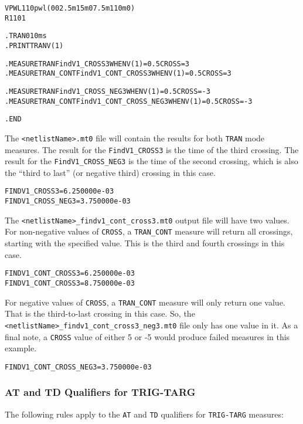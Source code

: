 \begin{alltt}
VPWL1 1 0 pwl(0 0 2.5m 1 5m 0 7.5m 1 10m 0)
R1 1 0 1

.TRAN 0 10ms
.PRINT TRAN V(1)

.MEASURE TRAN FindV1_CROSS3 WHEN V(1)=0.5 CROSS=3
.MEASURE TRAN_CONT FindV1_CONT_CROSS3 WHEN V(1)=0.5 CROSS=3

.MEASURE TRAN FindV1_CROSS_NEG3 WHEN V(1)=0.5 CROSS=-3
.MEASURE TRAN_CONT FindV1_CONT_CROSS_NEG3 WHEN V(1)=0.5 CROSS=-3

.END
\end{alltt}

The \texttt{<netlistName>.mt0} file will contain the results for both
\texttt{TRAN} mode measures.  The result for the \texttt{FindV1\_CROSS3}
is the time of the third crossing.  The result for the \texttt{FindV1\_CROSS\_NEG3}
is the time of the second crossing, which is also the ``third to last'' (or
negative third) crossing in this case.

\begin{alltt}
FINDV1_CROSS3 = 6.250000e-03
FINDV1_CROSS_NEG3 = 3.750000e-03
\end{alltt}

The \texttt{<netlistName>\_findv1\_cont\_cross3.mt0} output file will have two
values.  For non-negative values of \texttt{CROSS}, a \texttt{TRAN\_CONT} measure
will return all crossings, starting with the specified value.  This is the third
and fourth crossings in this case.

\begin{alltt}
FINDV1_CONT_CROSS3 = 6.250000e-03
FINDV1_CONT_CROSS3 = 8.750000e-03
\end{alltt}

For negative values of \texttt{CROSS}, a \texttt{TRAN\_CONT} measure will only
return one value.  That is the third-to-last crossing in this case.  So, the
\texttt{<netlistName>\_findv1\_cont\_cross3\_neg3.mt0} file only has one
value in it.  As a final note, a \texttt{CROSS} value of either 5 or -5 would
produce failed measures in this example.

\begin{alltt}
FINDV1_CONT_CROSS_NEG3 = 3.750000e-03
\end{alltt}

\subsubsection{AT and TD Qualifiers for TRIG-TARG}
The following rules apply to the \texttt{AT} and \texttt{TD} qualifiers
for \texttt{TRIG-TARG} measures:

